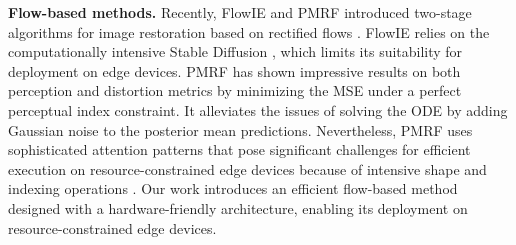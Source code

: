 \textbf{Flow-based methods.}
Recently, FlowIE \cite{zhu2024flowie} and PMRF \cite{ohayon2024posterior} introduced two-stage algorithms for image restoration based on rectified flows \cite{liu2023flow}. 
FlowIE relies on the computationally intensive Stable Diffusion \cite{rombach2022high}, which limits its suitability for deployment on edge devices.
PMRF has shown impressive results on both perception and distortion metrics by minimizing the MSE under a perfect perceptual index constraint. It alleviates the issues of solving the ODE by adding Gaussian noise to the posterior mean predictions. Nevertheless, PMRF uses sophisticated attention patterns that pose significant challenges for efficient execution on resource-constrained edge devices because of intensive shape and indexing operations \cite{li2022rethinking}. Our work introduces an efficient flow-based method designed with a hardware-friendly architecture, enabling its deployment on resource-constrained edge devices.